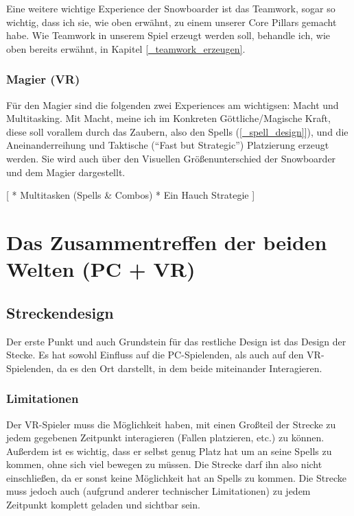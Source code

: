 Eine weitere wichtige Experience der Snowboarder ist das Teamwork, sogar so wichtig, dass ich sie, wie oben erwähnt, zu einem unserer Core Pillars gemacht habe. Wie Teamwork in unserem Spiel erzeugt werden soll, behandle ich, wie oben bereits erwähnt, in Kapitel \ref{_teamwork_erzeugen}.

\subsubsection{Magier (VR)}

Für den Magier sind die folgenden zwei Experiences am wichtigsen: Macht und Multitasking. Mit Macht, meine ich im Konkreten Göttliche/Magische Kraft, diese soll vorallem durch das Zaubern, also den Spells (\ref{_spell_design}]), und die Aneinanderreihung und Taktische ("`Fast but Strategic"') Platzierung erzeugt werden. Sie wird auch über den Visuellen Größenunterschied der Snowboarder und dem Magier dargestellt. 

[
* Multitasken (Spells \& Combos)
* Ein Hauch Strategie
]

\section{Das Zusammentreffen der beiden Welten (PC + VR)}

\subsection{Streckendesign}

Der erste Punkt und auch Grundstein für das restliche Design ist das Design der Stecke. Es hat sowohl Einfluss auf die PC-Spielenden, als auch auf den VR-Spielenden, da es den Ort darstellt, in dem beide miteinander Interagieren.

\subsubsection{Limitationen}

Der VR-Spieler muss die Möglichkeit haben, mit einen Großteil der Strecke zu jedem gegebenen Zeitpunkt interagieren (Fallen platzieren, etc.) zu können. Außerdem ist es wichtig, dass er selbst genug Platz hat um an seine Spells zu kommen, ohne sich viel bewegen zu müssen. Die Strecke darf ihn also nicht einschließen, da er sonst keine Möglichkeit hat an Spells zu kommen. Die Strecke muss jedoch auch (aufgrund anderer technischer Limitationen) zu jedem Zeitpunkt komplett geladen und sichtbar sein.

